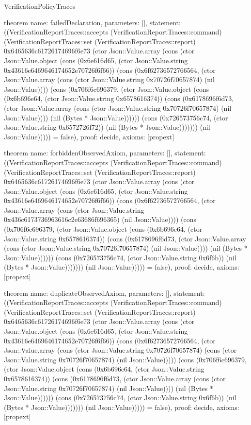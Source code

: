 \begin{lexlean}{VerificationPolicyTraces}
\begin{semanticmodule}
theorem{
  name: failedDeclaration,
  parameters: [],
  statement: ((VerificationReportTraces::accepts (VerificationReportTraces::command) (VerificationReportTraces::set (VerificationReportTraces::report) 0x6465636c61726174696f6e73 (ctor Json::Value.array (cons (ctor Json::Value.object (cons (0x6e616d65, (ctor Json::Value.string 0x43616e6469646174652e70726f6f66)) (cons (0x6f62736572766564, (ctor Json::Value.array (cons (ctor Json::Value.string 0x70726f70657874) (nil Json::Value)))) (cons (0x706f6c696379, (ctor Json::Value.object (cons (0x6b696e64, (ctor Json::Value.string 0x6578616374)) (cons (0x6178696f6d73, (ctor Json::Value.array (cons (ctor Json::Value.string 0x70726f70657874) (nil Json::Value)))) (nil (Bytes * Json::Value)))))) (cons (0x726573756c74, (ctor Json::Value.string 0x6572726f72)) (nil (Bytes * Json::Value))))))) (nil Json::Value))))) = false),
  proof: decide{},
  axioms: [propext]
}

theorem{
  name: forbiddenObservedAxiom,
  parameters: [],
  statement: ((VerificationReportTraces::accepts (VerificationReportTraces::command) (VerificationReportTraces::set (VerificationReportTraces::report) 0x6465636c61726174696f6e73 (ctor Json::Value.array (cons (ctor Json::Value.object (cons (0x6e616d65, (ctor Json::Value.string 0x43616e6469646174652e70726f6f66)) (cons (0x6f62736572766564, (ctor Json::Value.array (cons (ctor Json::Value.string 0x436c6173736963616c2e63686f696365) (nil Json::Value)))) (cons (0x706f6c696379, (ctor Json::Value.object (cons (0x6b696e64, (ctor Json::Value.string 0x6578616374)) (cons (0x6178696f6d73, (ctor Json::Value.array (cons (ctor Json::Value.string 0x70726f70657874) (nil Json::Value)))) (nil (Bytes * Json::Value)))))) (cons (0x726573756c74, (ctor Json::Value.string 0x6f6b)) (nil (Bytes * Json::Value))))))) (nil Json::Value))))) = false),
  proof: decide{},
  axioms: [propext]
}

theorem{
  name: duplicateObservedAxiom,
  parameters: [],
  statement: ((VerificationReportTraces::accepts (VerificationReportTraces::command) (VerificationReportTraces::set (VerificationReportTraces::report) 0x6465636c61726174696f6e73 (ctor Json::Value.array (cons (ctor Json::Value.object (cons (0x6e616d65, (ctor Json::Value.string 0x43616e6469646174652e70726f6f66)) (cons (0x6f62736572766564, (ctor Json::Value.array (cons (ctor Json::Value.string 0x70726f70657874) (cons (ctor Json::Value.string 0x70726f70657874) (nil Json::Value))))) (cons (0x706f6c696379, (ctor Json::Value.object (cons (0x6b696e64, (ctor Json::Value.string 0x6578616374)) (cons (0x6178696f6d73, (ctor Json::Value.array (cons (ctor Json::Value.string 0x70726f70657874) (nil Json::Value)))) (nil (Bytes * Json::Value)))))) (cons (0x726573756c74, (ctor Json::Value.string 0x6f6b)) (nil (Bytes * Json::Value))))))) (nil Json::Value))))) = false),
  proof: decide{},
  axioms: [propext]
}


\end{semanticmodule}
\end{lexlean}
